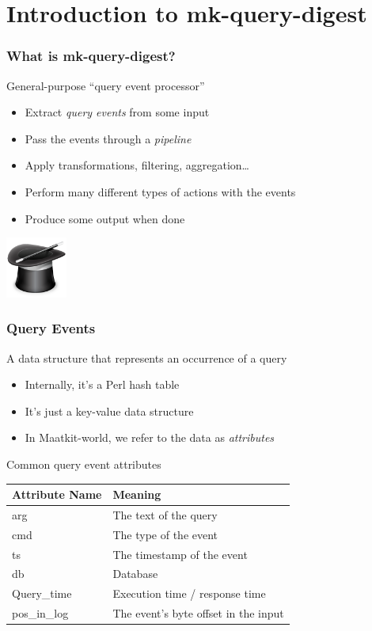 \section{Introduction to mk-query-digest}

\begin{frame}
   \frametitle{What is mk-query-digest?}
   \begin{block}{General-purpose ``query event processor''}
      \begin{itemize}
         \item Extract \emph{query events} from some input
         \item Pass the events through a \emph{pipeline}
         \item Apply transformations, filtering, aggregation\dots
         \item Perform many different types of actions with the events
         \item Produce some output when done
      \end{itemize}
   \end{block}
   \includegraphics[width=20mm]{../image/wizard}
\end{frame}

\begin{frame}
   \frametitle{Query Events}
   \begin{block}{A data structure that represents an occurrence of a query}
      \begin{itemize}
         \item Internally, it's a Perl hash table
         \item It's just a key-value data structure
         \item In Maatkit-world, we refer to the data as \emph{attributes}
      \end{itemize}
   \end{block}
   \pause
   \begin{block}{Common query event attributes}
      \begin{center}
      \begin{tabular}{ll}
         Attribute Name & Meaning \\
         \hline
         arg         & The text of the query \\
         cmd         & The type of the event \\
         ts          & The timestamp of the event \\
         db          & Database \\
         Query\_time & Execution time / response time \\
         pos\_in\_log & The event's byte offset in the input \\
      \end{tabular}
      \end{center}
   \end{block}
\end{frame}

